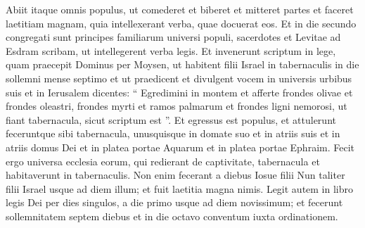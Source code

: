 \begin{biblechapter}
\begin{biblechapter}
\begin{biblechapter}
\begin{biblechapter}
\begin{biblechapter}
\begin{biblechapter}
\begin{biblechapter}
\begin{biblechapter}
\verse Abiit itaque omnis populus, ut comederet et biberet et mitteret partes et faceret laetitiam magnam, quia intellexerant verba, quae docuerat eos.
 \verse Et in die secundo congregati sunt principes familiarum universi populi, sacerdotes et Levitae ad Esdram scribam, ut intellegerent verba legis. 
\verse Et invenerunt scriptum in lege, quam praecepit Dominus per Moysen, ut habitent filii Israel in tabernaculis in die sollemni mense septimo 
\verse et ut praedicent et divulgent vocem in universis urbibus suis et in Ierusalem dicentes: “ Egredimini in montem et afferte frondes olivae et frondes oleastri, frondes myrti et ramos palmarum et frondes ligni nemorosi, ut fiant tabernacula, sicut scriptum est ”.
 \verse Et egressus est populus, et attulerunt feceruntque sibi tabernacula, unusquisque in domate suo et in atriis suis et in atriis domus Dei et in platea portae Aquarum et in platea portae Ephraim. 
\verse Fecit ergo universa ecclesia eorum, qui redierant de captivitate, tabernacula et habitaverunt in tabernaculis. Non enim fecerant a diebus Iosue filii Nun taliter filii Israel usque ad diem illum; et fuit laetitia magna nimis. 
\verse Legit autem in libro legis Dei per dies singulos, a die primo usque ad diem novissimum; et fecerunt sollemnitatem septem diebus et in die octavo conventum iuxta ordinationem.
 

\end{biblechapter}
\end{biblechapter}
\end{biblechapter}
\end{biblechapter}
\end{biblechapter}
\end{biblechapter}
\end{biblechapter}
\end{biblechapter}
